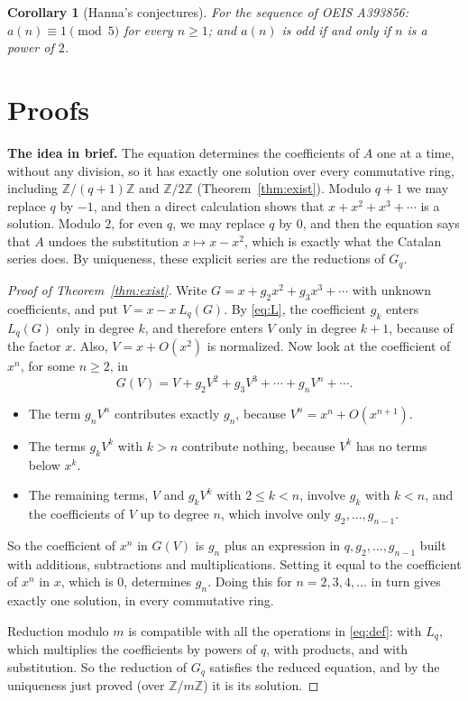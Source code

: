 \documentclass[11pt,a4paper]{article}
\newtheorem{corollary}[theorem]{Corollary}
\theoremstyle{definition}
\theoremstyle{remark}
\newcommand{\Z}{\mathbb{Z}}
\newcommand{\para}[1]{\par\medskip\noindent\textbf{#1}\enspace}
\begin{document}
\begin{corollary}[Hanna's conjectures]\label{cor:oeis}
For the sequence of OEIS A393856: $a(n)\equiv1\pmod{5}$ for every $n\ge1$; and $a(n)$ is odd if and only if $n$ is a power of $2$.
\end{corollary}

\section{Proofs}\label{sec:proofs}

\para{The idea in brief.} The equation determines the coefficients of $A$ one at a time, without any division, so it
has exactly one solution over every commutative ring, including $\Z/(q+1)\Z$ and $\Z/2\Z$
(Theorem~\ref{thm:exist}). Modulo $q+1$ we may replace $q$ by $-1$, and then a direct calculation shows that $x+x^2+x^3+\cdots$ is
a solution. Modulo $2$, for even $q$, we may replace $q$ by $0$, and then the equation says that $A$ undoes the
substitution $x\mapsto x-x^2$, which is exactly what the Catalan series does. By uniqueness, these explicit series
are the reductions of $G_q$.

\begin{proof}[Proof of Theorem~\ref{thm:exist}]
Write $G=x+g_2x^2+g_3x^3+\cdots$ with unknown coefficients, and put $V=x-x\,L_q(G)$. By \eqref{eq:L}, the coefficient
$g_k$ enters $L_q(G)$ only in degree $k$, and therefore enters $V$ only in degree $k+1$, because of the factor $x$. Also,
$V=x+O(x^2)$ is normalized. Now look at the coefficient of $x^n$, for some $n\ge2$, in
\[
G(V)=V+g_2V^2+g_3V^3+\cdots+g_nV^n+\cdots .
\]
\begin{itemize}
\item The term $g_nV^n$ contributes exactly $g_n$, because $V^n=x^n+O(x^{n+1})$.
\item The terms $g_kV^k$ with $k>n$ contribute nothing, because $V^k$ has no terms below $x^k$.
\item The remaining terms, $V$ and $g_kV^k$ with $2\le k<n$, involve $g_k$ with $k<n$, and the coefficients of $V$ up
to degree $n$, which involve only $g_2,\dots,g_{n-1}$.
\end{itemize}
So the coefficient of $x^n$ in $G(V)$ is $g_n$ plus an expression in $q,g_2,\dots,g_{n-1}$ built with additions,
subtractions and multiplications. Setting it equal to the coefficient of $x^n$ in $x$, which is $0$, determines $g_n$.
Doing this for $n=2,3,4,\dots$ in turn gives exactly one solution, in every commutative ring.

Reduction modulo $m$ is compatible with all the operations in \eqref{eq:def}: with $L_q$, which multiplies the
coefficients by powers of $q$, with products, and with substitution. So the reduction of $G_q$ satisfies the reduced
equation, and by the uniqueness just proved (over $\Z/m\Z$) it is its solution.
\end{proof}
\end{document}
